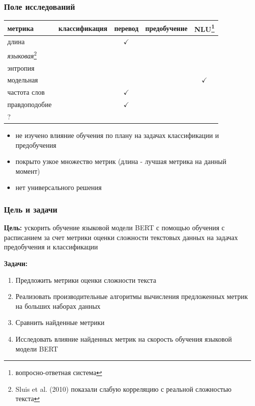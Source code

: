 \documentclass{beamer}
\begin{document}
\begin{frame}
	\frametitle{Поле исследований}
	\begin{table}
		\begin{tabular}{l|cccc}
			метрика & классификация & перевод & предобучение & NLU\footnote[1]{вопросно-ответная система} \\
			\hline
			длина & & $\checkmark$ & & \\
			{\it языковая}\footnote[2]{Sluis et al. (2010) показали слабую корреляцию с реальной сложностью текста} & & & & \\
			энтропия & & & & \\
			модельная & & & & $\checkmark$ \\
			частота слов & & $\checkmark$ & & \\
			правдоподобие & & $\checkmark$ & & \\
			\hline
			? & & & & \\
			\hline
		\end{tabular}
	\end{table}
	\begin{itemize}
		\item не изучено влияние обучения по плану на задачах классификации и предобучения
		\item покрыто узкое множество метрик (длина - лучшая метрика на данный момент)
		\item нет универсального решения
	\end{itemize}
\end{frame}

\begin{frame}
	\frametitle{Цель и задачи}
	{\bf Цель:} ускорить обучение языковой модели BERT с помощью обучения с расписанием за счет метрики оценки сложности текстовых данных на задачах предобучения и классификации
	
	{\bf Задачи:}
	\begin{enumerate}
		\item Предложить метрики оценки сложности текста
		\item Реализовать производительные алгоритмы вычисления предложенных метрик на больших наборах данных
		\item Сравнить найденные метрики
		\item Исследовать влияние найденных метрик на скорость обучения языковой модели BERT
	\end{enumerate}
\end{frame}
\end{document}
